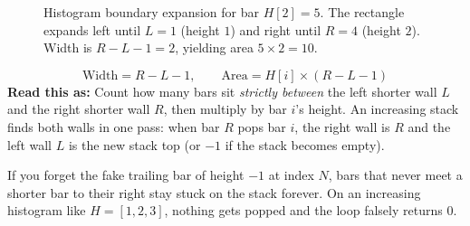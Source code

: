 \documentclass[11pt,a4paper]{article}
\theoremstyle{definition}
\begin{document}
\begin{figure}[htbp]
\caption{Histogram boundary expansion for bar $H[2] = 5$. The rectangle expands left until $L = 1$ (height $1$) and right until $R = 4$ (height $2$). Width is $R - L - 1 = 2$, yielding area $5 \times 2 = 10$.}
\label{fig:histogram_expansion}
\end{figure}

\begin{formulabox}
$$
\text{Width} = R - L - 1, \qquad \text{Area} = H[i] \times (R - L - 1)
$$
\textbf{Read this as:} Count how many bars sit \emph{strictly between} the left shorter wall $L$ and the right shorter wall $R$, then multiply by bar $i$'s height. An increasing stack finds both walls in one pass: when bar $R$ pops bar $i$, the right wall is $R$ and the left wall $L$ is the new stack top (or $-1$ if the stack becomes empty).
\end{formulabox}

\begin{watchoutbox}
If you forget the fake trailing bar of height $-1$ at index $N$, bars that never meet a shorter bar to their right stay stuck on the stack forever. On an increasing histogram like $H = [1, 2, 3]$, nothing gets popped and the loop falsely returns $0$.
\end{watchoutbox}
\end{document}
